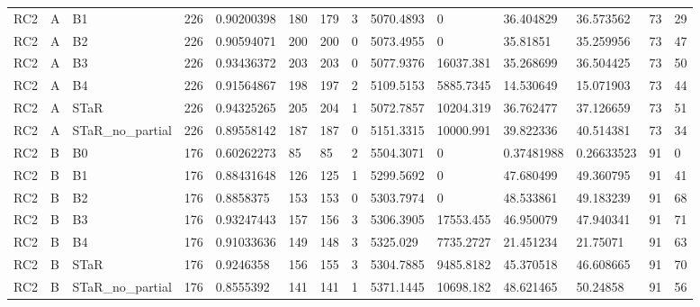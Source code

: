 \begin{longtable}{llllllllllllll}
RC2 & A & B1 & 226 & 0.90200398 & 180 & 179 & 3 & 5070.4893 & 0 & 36.404829 & 36.573562 & 73 & 29 \\
RC2 & A & B2 & 226 & 0.90594071 & 200 & 200 & 0 & 5073.4955 & 0 & 35.81851 & 35.259956 & 73 & 47 \\
RC2 & A & B3 & 226 & 0.93436372 & 203 & 203 & 0 & 5077.9376 & 16037.381 & 35.268699 & 36.504425 & 73 & 50 \\
RC2 & A & B4 & 226 & 0.91564867 & 198 & 197 & 2 & 5109.5153 & 5885.7345 & 14.530649 & 15.071903 & 73 & 44 \\
RC2 & A & STaR & 226 & 0.94325265 & 205 & 204 & 1 & 5072.7857 & 10204.319 & 36.762477 & 37.126659 & 73 & 51 \\
RC2 & A & STaR\_no\_partial & 226 & 0.89558142 & 187 & 187 & 0 & 5151.3315 & 10000.991 & 39.822336 & 40.514381 & 73 & 34 \\
RC2 & B & B0 & 176 & 0.60262273 & 85 & 85 & 2 & 5504.3071 & 0 & 0.37481988 & 0.26633523 & 91 & 0 \\
RC2 & B & B1 & 176 & 0.88431648 & 126 & 125 & 1 & 5299.5692 & 0 & 47.680499 & 49.360795 & 91 & 41 \\
RC2 & B & B2 & 176 & 0.8858375 & 153 & 153 & 0 & 5303.7974 & 0 & 48.533861 & 49.183239 & 91 & 68 \\
RC2 & B & B3 & 176 & 0.93247443 & 157 & 156 & 3 & 5306.3905 & 17553.455 & 46.950079 & 47.940341 & 91 & 71 \\
RC2 & B & B4 & 176 & 0.91033636 & 149 & 148 & 3 & 5325.029 & 7735.2727 & 21.451234 & 21.75071 & 91 & 63 \\
RC2 & B & STaR & 176 & 0.9246358 & 156 & 155 & 3 & 5304.7885 & 9485.8182 & 45.370518 & 46.608665 & 91 & 70 \\
RC2 & B & STaR\_no\_partial & 176 & 0.8555392 & 141 & 141 & 1 & 5371.1445 & 10698.182 & 48.621465 & 50.24858 & 91 & 56 \\
\hline
\end{longtable}
